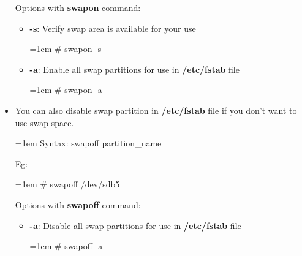 \begin{flushleft}
\begin{itemize}
	Options with \textbf{swapon} command:
	\begin{itemize}
		\item 	\textbf{-s}: Verify swap area is available for your use
		\bigskip
		\begin{tcolorbox}[breakable,notitle,boxrule=-0pt,colback=black,colframe=black]
			\color{green}
			\font=1em
			\# swapon -s
			\font=4pt
		\end{tcolorbox}
		\item \textbf{-a}: Enable all swap partitions for use in \textbf{/etc/fstab} file
		\bigskip
		\begin{tcolorbox}[breakable,notitle,boxrule=-0pt,colback=black,colframe=black]
			\color{green}
			\font=1em
			\# swapon -a
			\font=4pt
		\end{tcolorbox}
		
	\end{itemize}

	
	\newpage
	\item You can also disable swap partition in \textbf{/etc/fstab} file if you don't want to use swap space.
	\begin{tcolorbox}[breakable,notitle,boxrule=-0pt,colback=pink,colframe=pink]
		\color{black}
		\font=1em
		Syntax: swapoff partition\_name
		\font=4pt
	\end{tcolorbox}
	
	Eg:
	\begin{tcolorbox}[breakable,notitle,boxrule=-0pt,colback=black,colframe=black]
		\color{green}
		\font=1em
		\# swapoff /dev/sdb5
		\font=4pt
	\end{tcolorbox}
	
	Options with \textbf{swapoff} command:
	\begin{itemize}
		\item \textbf{-a}: Disable all swap partitions for use in \textbf{/etc/fstab} file
		\bigskip
		\begin{tcolorbox}[breakable,notitle,boxrule=-0pt,colback=black,colframe=black]
			\color{green}
			\font=1em
			\# swapoff -a
			\font=4pt
		\end{tcolorbox}
		
	\end{itemize}
	
\end{itemize}

	
\end{flushleft}

\newpage


